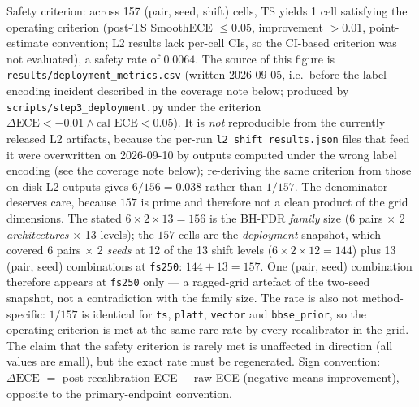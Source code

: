 \documentclass[review,12pt,nonatbib]{elsarticle}
\begin{document}
Safety criterion: across 157 (pair, seed, shift) cells, TS
yields 1 cell satisfying the operating criterion (post-TS SmoothECE
$\leq 0.05$, improvement $>0.01$, point-estimate convention; L2 results
lack per-cell CIs, so the CI-based criterion was not evaluated), a safety
rate of $0.0064$. The source of this figure is
\texttt{results/deployment\_metrics.csv} (written 2026-09-05, i.e.\ before
the label-encoding incident described in the coverage note below; produced by
\texttt{scripts/step3\_deployment.py} under the criterion
$\Delta\text{ECE}<-0.01 \wedge \text{cal ECE}<0.05$). It is \emph{not}
reproducible from the currently released L2 artifacts, because the
per-run \texttt{l2\_shift\_results.json} files that feed it were
overwritten on 2026-09-10 by outputs computed under the wrong label
encoding (see the coverage note below); re-deriving the same criterion
from those on-disk L2 outputs gives $6/156 = 0.038$ rather than $1/157$.
The denominator deserves care, because $157$ is prime and therefore not
a clean product of the grid dimensions. The stated
$6 \times 2 \times 13 = 156$ is the BH-FDR \emph{family} size (6 pairs
$\times$ 2 \emph{architectures} $\times$ 13 levels); the $157$ cells are
the \emph{deployment} snapshot, which covered 6 pairs $\times$ 2
\emph{seeds} at 12 of the 13 shift levels ($6 \times 2 \times 12 = 144$)
plus 13 (pair, seed) combinations at \texttt{fs250}: $144 + 13 = 157$.
One (pair, seed) combination therefore appears at \texttt{fs250} only ---
a ragged-grid artefact of the two-seed snapshot, not a contradiction with
the family size. The rate is also not method-specific: $1/157$ is
identical for \texttt{ts}, \texttt{platt}, \texttt{vector} and
\texttt{bbse\_prior}, so the operating criterion is met at the same rare
rate by every recalibrator in the grid. The claim that the
safety criterion is rarely met is unaffected in direction (all values
are small), but the exact rate must be regenerated. Sign convention:
$\Delta\text{ECE}$ $=$ post-recalibration ECE $-$ raw ECE (negative means
improvement), opposite to the primary-endpoint convention.
\end{document}
